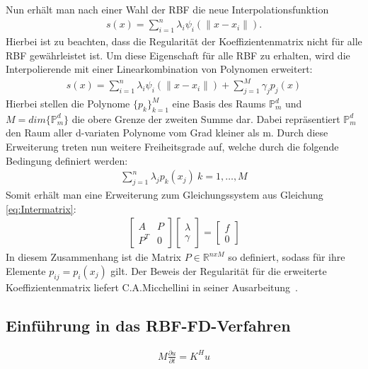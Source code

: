 \documentclass[a4paper,11pt]{article}
\begin{document}
\noindent
Nun erhält man nach einer Wahl der RBF die neue Interpolationsfunktion
\begin{align}
 s(x)=\sum_{i=1}^n\lambda_i\psi_i(\|x-x_i\|).
\end{align}
Hierbei ist zu beachten, dass die Regularität der Koeffizientenmatrix nicht für alle RBF gewährleistet ist. Um diese Eigenschaft für alle RBF zu erhalten, wird die Interpolierende mit einer Linearkombination von Polynomen erweitert:
\begin{align}
 s(x)=\sum_{i=1}^n\lambda_i\psi_i(\|x-x_i\|)+\sum_{j=1}^M\gamma_jp_j(x)
\end{align}
Hierbei stellen die Polynome $\{p_k\}_{k=1}^M$ eine Basis des Raums $\mathbb{P}_m^d$ und $M=dim\{\mathbb{P}_m^d\}$ die obere Grenze der zweiten Summe dar. Dabei repräsentiert $\mathbb{P}_m^d$ den Raum aller d-variaten Polynome vom Grad kleiner als m. Durch diese Erweiterung treten nun weitere Freiheitsgrade auf, welche durch die folgende Bedingung definiert werden:
\begin{align}
 \sum_{j=1}^n\lambda_jp_k(x_j)~k=1,\dots,M
\end{align}
Somit erhält man eine Erweiterung zum Gleichungssystem aus Gleichung \eqref{eq:Intermatrix}:
\begin{align}
\begin{bmatrix}
 A & P \\ P^T & 0
\end{bmatrix}
\begin{bmatrix}
 \lambda  \\ \gamma
\end{bmatrix}
=
\begin{bmatrix}
 f  \\ 0
\end{bmatrix}\label{eq:Inter}
\end{align}
In diesem Zusammenhang ist die Matrix $P\in\mathbb{R}^{nxM}$ so definiert, sodass für ihre Elemente $p_{ij}=p_i(x_j)$ gilt. Der Beweis der Regularität für die erweiterte Koeffizientenmatrix liefert C.A.Micchellini in seiner Ausarbeitung~\cite{micchelli1984interpolation}.
\subsection{Einführung in das RBF-FD-Verfahren}
\begin{align}
 M\frac{\partial u}{\partial t}=K^Hu\label{eq:algTrans}
\end{align}
\pagebreak
\end{document}
